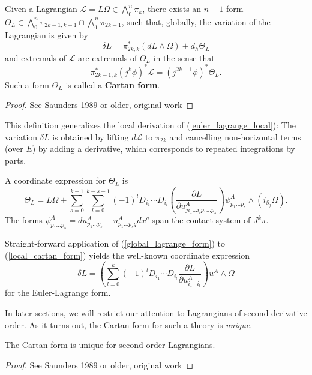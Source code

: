 \begin{proposition}
  Given a Lagrangian $\mathcal L = L\Omega \in \bigwedge^n_0\pi_k$, there exists an $n+1$ form $\Theta_L\in\bigwedge^{n}_0\pi_{2k-1,k-1}\cap\bigwedge^{n}_{1}\pi_{2k-1}$, such that, globally, the variation of the Lagrangian is given by
  \begin{equation}\label{global_lagrange_form}
    \delta L = \pi^\ast_{2k,k} \left( dL\wedge\Omega\right) + d_h \Theta_L
  \end{equation}
  and extremals of $\mathcal L$ are extremals of $\Theta_L$ in the sense that
  \begin{equation}
    \pi_{2k-1,k}^\ast (j^k\phi)^\ast\mathcal L = (j^{2k-1}\phi)^\ast\Theta_L.
  \end{equation}
  Such a form $\Theta_L$ is called a \textbf{Cartan form}.
\end{proposition}
\begin{proof}
  See Saunders 1989 or older, original work
\end{proof}

This definition generalizes the local derivation of (\ref{euler_lagrange_local}): The variation $\delta L$ is obtained by lifting $d\mathcal L$ to $\pi_{2k}$ and cancelling non-horizontal terms (over $E$) by adding a derivative, which corresponds to repeated integrations by parts.

A coordinate expression for $\Theta_L$ is
\begin{equation}\label{local_cartan_form}
  \Theta_L = L\Omega + \sum_{s=0}^{k-1} \sum_{l=0}^{k-s-1} (-1)^l D_{i_1} \cdots D_{i_l} \left(\frac{\partial L}{\partial u^A_{j i_1 \dots i_{l} p_1 \dots p_s}}\right) \psi^A_{p_1\dots p_s} \wedge \left(i_{\partial_j}\Omega\right).
\end{equation}
The forms $\psi^A_{p_1\dots p_s} = du^A_{p_1\dots p_s} - u^A_{p_1\dots p_sq} dx^q$ span the contact system of $J^k\pi$.

Straight-forward application of (\ref{global_lagrange_form}) to (\ref{local_cartan_form}) yields the well-known coordinate expression
\begin{equation}
  \delta L = \left( \sum_{l=0}^{k} (-1)^l D_{i_1} \cdots D_{i_l} \frac{\partial L}{\partial u^A_{i_1\cdots i_l}}\right) u^A \wedge \Omega
\end{equation}
for the Euler-Lagrange form.

In later sections, we will restrict our attention to Lagrangians of second derivative order. As it turns out, the Cartan form for such a theory is \emph{unique}.
\begin{proposition}
  The Cartan form is unique for second-order Lagrangians.
\end{proposition}
\begin{proof}
  See Saunders 1989 or older, original work
\end{proof}

